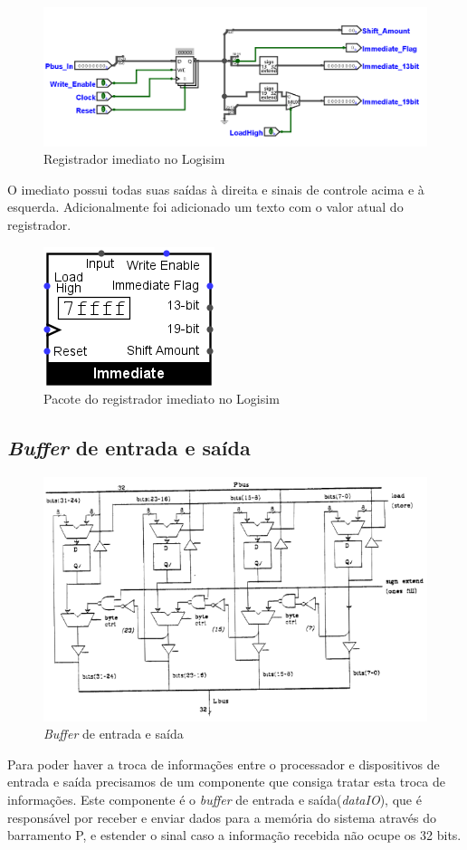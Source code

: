 \documentclass[
	article,			%
	11pt,				%
	oneside,			%
	a4paper,			%
	english,			%
	brazil,				%
	sumario=tradicional
	]{abntex2}
\begin{document}
\begin{figure}[H]
    \centering
    \includegraphics[width=0.75\linewidth]{Logisim/immediate.png}
    \caption{Registrador imediato no Logisim}
    \label{fig:immediate}
\end{figure}
O imediato possui todas suas saídas à direita e sinais de controle acima e à esquerda. Adicionalmente foi adicionado um texto com o valor atual do registrador. 
\begin{figure}[H]
    \centering
    \includegraphics[width=0.25\linewidth]{Logisim/immediatePack.png}
    \caption{Pacote do registrador imediato no Logisim}
    \label{fig:immediatePack}
\end{figure}
\subsection{\textit{Buffer} de entrada e saída}\label{cap:dataio}
\begin{figure}[H]
    \centering
    \includegraphics[width=0.75\linewidth]{Original/dataIOPeek.png}
    \caption{\textit{Buffer} de entrada e saída\cite{peek_vlsi_1983}}
    \label{fig:dataIOPeek}
\end{figure}
Para poder haver a troca de informações entre o processador e dispositivos de entrada e saída precisamos de um componente que consiga tratar esta troca de informações. Este componente é o \textit{buffer} de entrada e saída(\textit{dataIO}), que é responsável por receber e enviar dados para a memória do sistema através do barramento P, e estender o sinal caso a informação recebida não ocupe os 32 bits. 
\end{document}
